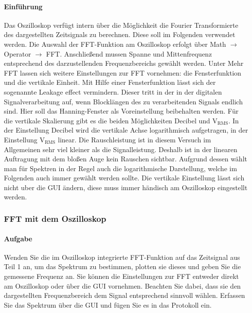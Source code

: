 \documentclass[10pt]{report}
\begin{document}
        \paragraph{Einführung}
        Das Oszilloskop verfügt intern über die Möglichkeit die Fourier Transformierte des dargestellten
        Zeitsignals zu berechnen. Diese soll im Folgenden verwendet werden.
        Die Auswahl der FFT-Funktion am Oszilloskop erfolgt über
        \glqq{}Math\grqq{} $\rightarrow$ \glqq{}Operator\grqq{} $\rightarrow$ \glqq{}FFT\grqq{}.
        Anschließend mussen Spanne und Mittenfrequenz entsprechend des darzustellenden Frequenzbereichs gewählt werden.
        Unter \glqq{} Mehr FFT\grqq{} lassen sich weitere Einstellungen
        zur FFT vornehmen: die Fensterfunktion und die vertikale Einheit.
        Mit Hilfe einer Fensterfunktion lässt sich der sogenannte \glqq{}Leakage effect\grqq{} vermindern.
        Dieser tritt in der in der digitalen Signalverarbeitung auf, wenn Blocklängen des zu verarbeitenden
        Signals endlich sind. Hier soll das \glqq{}Hanning-Fenster\grqq{} als Voreinstellung beibehalten
        werden.
        Für die vertikale Skalierung gibt es die beiden Möglichkeiten \glqq{}Decibel\grqq{} und
        \glqq{}$\text{V}_{\text{RMS}}$\grqq{}.
        In der Einstellung \glqq{}
        Decibel\grqq{} wird die vertikale Achse logarithmisch aufgetragen, in der
        Einstellung \glqq{}$\text{V}_{\text{RMS}}$\grqq{} linear. Die Rauschleistung ist in diesem Versuch im Allgemeinen sehr
        viel kleiner als die Signalleistung. Deshalb ist in der linearen Auftragung mit dem bloßen
        Auge kein Rauschen sichtbar. Aufgrund dessen wählt man für Spektren in der Regel auch
        die logarithmische Darstellung, welche im Folgenden auch immer gewählt werden sollte.
        Die vertikale Einstellung lässt sich nicht uber die GUI ändern, diese muss immer händisch
        am Oszilloskop eingestellt werden.
        \subsubsection{FFT mit dem Oszilloskop}
        \paragraph{Aufgabe}
        Wenden Sie die im Oszilloskop integrierte FFT-Funktion auf das Zeitsignal aus
        Teil 1 an, um das Spektrum zu bestimmen, plotten sie dieses und geben Sie die
        gemessene Frequenz an. Sie können die Einstellungen zur FFT entweder direkt
        am Oszilloskop oder über die GUI vornehmen. Beachten Sie dabei, dass sie den
        dargestellten Frequenzbereich dem Signal entsprechend sinnvoll wählen. Erfassen
        Sie das Spektrum über die GUI und fügen Sie es in das Protokoll ein.
\end{document}
